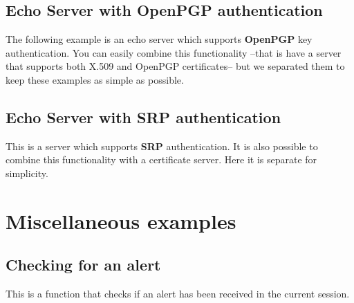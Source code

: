 \subsection{Echo Server with OpenPGP authentication}
The following example is an echo server which supports {\bf OpenPGP} key 
authentication. You can easily combine this functionality --that is have
a server that supports both X.509 and OpenPGP certificates-- but we
separated them to keep these examples as simple as possible.



\subsection{Echo Server with SRP authentication}
This is a server which supports {\bf SRP} authentication. It is also
possible to combine this functionality with a certificate server. Here it
is separate for simplicity.


\section{Miscellaneous examples}

\subsection{Checking for an alert}
This is a function that checks if an alert has been received
in the current session.



